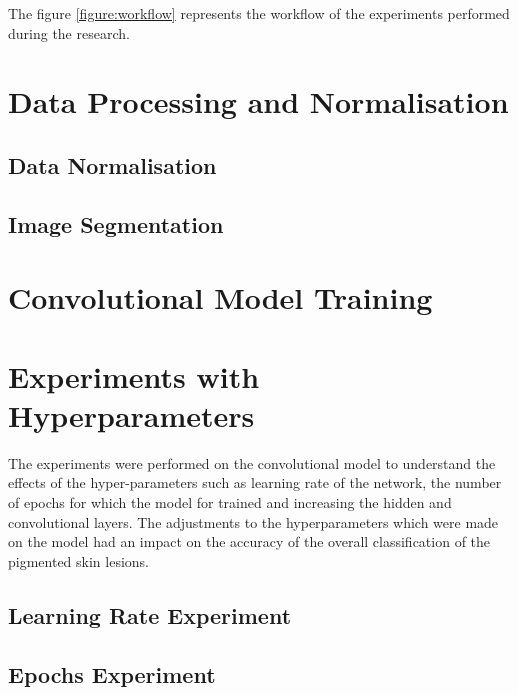 The figure \ref{figure:workflow} represents the workflow of the experiments 
performed during the research.
\pagebreak
\section{Data Processing and Normalisation}

\subsection{Data Normalisation}

\subsection{ Image Segmentation }

\pagebreak
\section{Convolutional Model Training}


\pagebreak
\section{Experiments with Hyperparameters}
The experiments were performed on the convolutional model to understand the effects of the hyper-parameters 
such as learning rate of the network, the number of epochs for which the model for trained and increasing the hidden  
and convolutional layers. The adjustments to the hyperparameters which were made on the model had an impact on the accuracy of the overall classification of the pigmented skin lesions.
\subsection{Learning Rate Experiment}


\subsection{Epochs Experiment}

